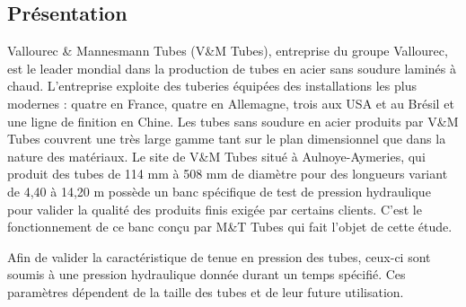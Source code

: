 \documentclass[10pt,fleqn]{article} %
\begin{document}

\vspace{5cm}
\pagestyle{fancy}
\thispagestyle{plain}

\def\columnseprulecolor{\color{ocre}}
\setlength{\columnseprule}{0.4pt} 


\begin{multicols}{2}

\section*{Présentation}
Vallourec \& Mannesmann Tubes (V\&M Tubes), entreprise du groupe Vallourec, est le leader mondial dans la production de tubes en acier sans soudure laminés à chaud. L’entreprise exploite des tuberies équipées des installations les plus modernes : quatre en France, quatre en Allemagne, trois  aux USA et au Brésil et une ligne de finition en Chine.
Les tubes sans soudure en acier produits par V\&M Tubes couvrent une très large gamme tant sur le plan dimensionnel que dans la nature des matériaux.
Le site de V\&M Tubes situé à Aulnoye-Aymeries, qui produit des tubes de 114 mm à 508 mm de diamètre pour des longueurs variant de 4,40 à 14,20 m possède un banc spécifique de test de pression hydraulique pour valider la qualité des produits finis exigée par certains clients. C’est le fonctionnement de ce banc conçu par M\&T Tubes qui fait l’objet de cette étude.

Afin de valider la caractéristique de tenue en pression des tubes, ceux-ci sont soumis à une pression hydraulique donnée durant un temps spécifié. Ces paramètres dépendent de la taille des tubes et de leur future utilisation.


\end{multicols}
\end{document}
